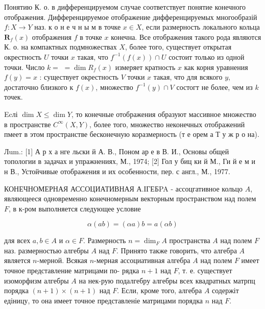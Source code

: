 \documentclass[10pt]{article}
\begin{document}
Понятию К. о. в дифференцируемом случае соответствует понятие конечного отображения. Дифференцируемое отображение дифференцируемых многообразій $f: X \rightarrow Y$ наз. к о н е ч н ы м в точке $x \in X$, если размерность локального кольца $\boldsymbol{R}_{f}(x)$ отображения $f$ в точке $x$ конечна. Все отображения такого рода являются К. о. на компактных подмножествах $X$, более того, существует открытая окрестность $U$ точки $x$ такая, что $f^{-1}(f(x)) \cap U$ состоит только из одной точки. Число $k=$ $=\operatorname{dim} R_{f}(x)$ измеряет кратность $x$ как корня уравнения $f(y)=x$ : существует окрестность $V$ точки $x$ такая, что для всякого $y$, достаточно близкого к $f(x)$, множество $f^{-1}(y) \cap V$ состогт не более, чем из $k$ точек.



Ecлі $\operatorname{dim} X \leqslant \operatorname{dim} Y$, то конечные отображения образуют массивное множество в пространстве $C^{\infty}(X, Y)$, более того, множество неконечных отображений пмеет в этом пространстве бесконечную коразмерность (т е орем а Т у ж р о на).



Лum.: [1] А р х а нге льски й А. В., Поном ар е в В. И., Основы общей топологии в задачах и упражнениях, М., 1974; [2] Гол у биц ки й М., Ги й е м и н В., Устойчивые отображения и их особенности, пер. с англ., М., 1977.



КОНЕЧНОМЕРНАЯ АССОЦИАТИВНАЯ А.ІГЕБPA - ассоцгативное кольцо $A$, являющееся одновременно конечномерным векторным пространством над полем $F$, в к-ром выполняется следующее условие



\[

\alpha(a b)=(\alpha a) b=a(\alpha b)

\]



для всех $a, b \in A$ и $\alpha \in F$. Размерность $n=\operatorname{dim}_{F} A$ пространства $A$ над полем $F$ наз. размерностью алгебры $A$ над $F$. Принято также говорить, что алгебра $A$ является $n$-мерной. Всякая $n$-мерная ассоциативная алгебра $A$ над полем $F$ имеет точное представление матрицами по- рядка $n+1$ над $F$, т. е. существует изоморфизм алгебры $A$ на нек-рую подалгебру алгебры всех квадратных матрпц порядка $(n+1) \times(n+1)$ над $F$. Если, кроме того, алгебра $A$ содержіт едіницу, то она имеет точное представленіе матрицами порядка $n$ над $F$.
\end{document}
